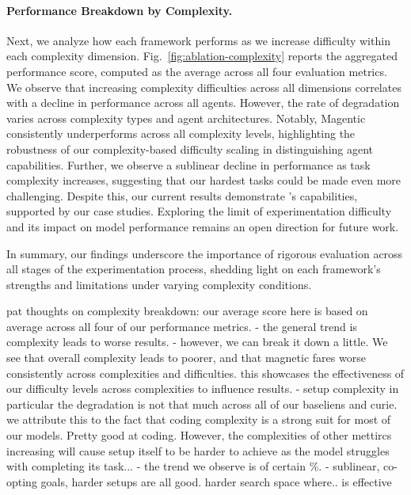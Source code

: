 \paragraph{Performance Breakdown by Complexity.}
Next, we analyze how each framework performs as we increase difficulty within each complexity dimension. Fig.~\ref{fig:ablation-complexity} reports the aggregated performance score, computed as the average across all four evaluation metrics.
We observe that increasing complexity difficulties across all dimensions correlates with a decline in performance across all agents. However, the rate of degradation varies across complexity types and agent architectures. Notably, Magentic consistently underperforms across all complexity levels, highlighting the robustness of our complexity-based difficulty scaling in distinguishing agent capabilities.
Further, we observe a sublinear decline in performance as task complexity increases, suggesting that our hardest tasks could be made even more challenging. Despite this, our current results demonstrate \sys's capabilities, supported by our case studies. Exploring the limit of experimentation difficulty and its impact on model performance remains an open direction for future work.

In summary, our findings underscore the importance of rigorous evaluation across all stages of the experimentation process, shedding light on each framework’s strengths and limitations under varying complexity conditions.

pat thoughts on complexity breakdown: our average score here is based on average across all four of our performance metrics. 
- the general trend is complexity leads to worse results. 
- however, we can break it down a little. We see that overall complexity leads to poorer, and that magnetic fares worse consistently across complexities and difficulties. this showcases the effectiveness of our difficulty levels across complexities to influence results. 
- setup complexity in particular the degradation is not that much across all of our baseliens and curie. we attribute this to the fact that coding complexity is a strong suit for most of our models. Pretty good at coding. However, the complexities of other mettircs increasing will cause setup itself to be harder to achieve as the model struggles with completing its task... 
- the trend we observe is of certain \%.
- sublinear, co-opting goals, harder  setups are all good. harder search space where.. is effective 

\fi

